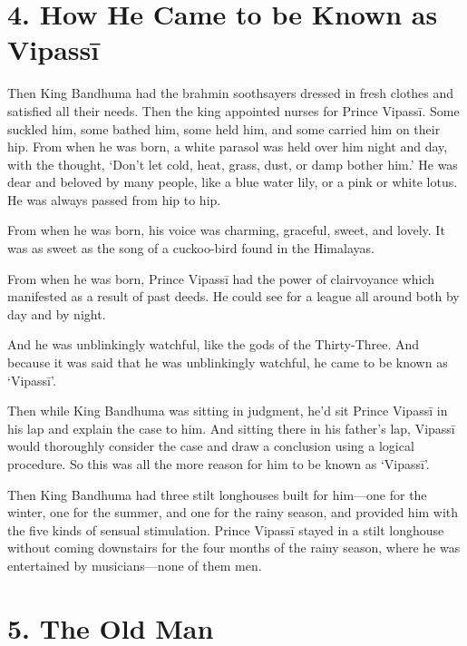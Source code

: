 \documentclass[12pt,openany]{book}%
\begin{document}
\section*{4. How He Came to be Known as \textsanskrit{Vipassī} }

Then King Bandhuma had the brahmin soothsayers dressed in fresh clothes and satisfied all their needs. Then the king appointed nurses for Prince \textsanskrit{Vipassī}. Some suckled him, some bathed him, some held him, and some carried him on their hip. From when he was born, a white parasol was held over him night and day, with the thought, ‘Don’t let cold, heat, grass, dust, or damp bother him.’ He was dear and beloved by many people, like a blue water lily, or a pink or white lotus. He was always passed from hip to hip. 

From when he was born, his voice was charming, graceful, sweet, and lovely. It was as sweet as the song of a cuckoo-bird found in the Himalayas. 

From when he was born, Prince \textsanskrit{Vipassī} had the power of clairvoyance which manifested as a result of past deeds. He could see for a league all around both by day and by night. 

And he was unblinkingly watchful, like the gods of the Thirty-Three. And because it was said that he was unblinkingly watchful, he came to be known as ‘\textsanskrit{Vipassī}’. 

Then while King Bandhuma was sitting in judgment, he’d sit Prince \textsanskrit{Vipassī} in his lap and explain the case to him. And sitting there in his father’s lap, \textsanskrit{Vipassī} would thoroughly consider the case and draw a conclusion using a logical procedure. So this was all the more reason for him to be known as ‘\textsanskrit{Vipassī}’. 

Then King Bandhuma had three stilt longhouses built for him—one for the winter, one for the summer, and one for the rainy season, and provided him with the five kinds of sensual stimulation. Prince \textsanskrit{Vipassī} stayed in a stilt longhouse without coming downstairs for the four months of the rainy season, where he was entertained by musicians—none of them men. 

\section*{5. The Old Man }
\end{document}
